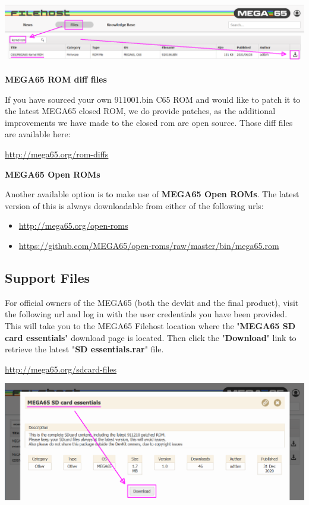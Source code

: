 \includegraphics[width=\linewidth]{images/latest_closed_rom.png}

\textbf{MEGA65 ROM diff files}

If you have sourced your own 911001.bin C65 ROM and would like to patch it to the latest MEGA65 closed ROM,
we do provide patches, as the additional improvements we have made to the closed rom are open source.
Those diff files are available here:

\url{http://mega65.org/rom-diffs}

\textbf{MEGA65 Open ROMs}

Another available option is to make use of \textbf{MEGA65 Open ROMs}. The latest version of this is always downloadable from either of the following urls:

\begin{itemize}
  \item \url{http://mega65.org/open-roms}
  \item \url{https://github.com/MEGA65/open-roms/raw/master/bin/mega65.rom}
\end{itemize}


\subsection{Support Files}

For official owners of the MEGA65 (both the devkit and the final product), visit the following url and log in with the user credentials you have been provided. This will take you to the MEGA65 Filehost location where the "\textbf{MEGA65 SD card essentials}" download page is located. Then click the "\textbf{Download}" link to retrieve the latest "\textbf{SD essentials.rar}" file.

\url{http://mega65.org/sdcard-files}

\includegraphics[width=\linewidth]{images/latest_support_files_with_closedrom.png}

